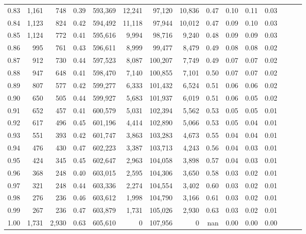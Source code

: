 \begin{tabular}{rrrrrrrrrrrrrrr}
0.83 &   1,161 &    748 &  0.39 &  593,369 &   12,241 &   97,120 &   10,836 &  0.47 &  0.10 &  0.11 &      0.03 \\
0.84 &   1,123 &    824 &  0.42 &  594,492 &   11,118 &   97,944 &   10,012 &  0.47 &  0.09 &  0.10 &      0.03 \\
0.85 &   1,124 &    772 &  0.41 &  595,616 &    9,994 &   98,716 &    9,240 &  0.48 &  0.09 &  0.09 &      0.03 \\
0.86 &     995 &    761 &  0.43 &  596,611 &    8,999 &   99,477 &    8,479 &  0.49 &  0.08 &  0.08 &      0.02 \\
0.87 &     912 &    730 &  0.44 &  597,523 &    8,087 &  100,207 &    7,749 &  0.49 &  0.07 &  0.07 &      0.02 \\
0.88 &     947 &    648 &  0.41 &  598,470 &    7,140 &  100,855 &    7,101 &  0.50 &  0.07 &  0.07 &      0.02 \\
0.89 &     807 &    577 &  0.42 &  599,277 &    6,333 &  101,432 &    6,524 &  0.51 &  0.06 &  0.06 &      0.02 \\
0.90 &     650 &    505 &  0.44 &  599,927 &    5,683 &  101,937 &    6,019 &  0.51 &  0.06 &  0.05 &      0.02 \\
0.91 &     652 &    457 &  0.41 &  600,579 &    5,031 &  102,394 &    5,562 &  0.53 &  0.05 &  0.05 &      0.01 \\
0.92 &     617 &    496 &  0.45 &  601,196 &    4,414 &  102,890 &    5,066 &  0.53 &  0.05 &  0.04 &      0.01 \\
0.93 &     551 &    393 &  0.42 &  601,747 &    3,863 &  103,283 &    4,673 &  0.55 &  0.04 &  0.04 &      0.01 \\
0.94 &     476 &    430 &  0.47 &  602,223 &    3,387 &  103,713 &    4,243 &  0.56 &  0.04 &  0.03 &      0.01 \\
0.95 &     424 &    345 &  0.45 &  602,647 &    2,963 &  104,058 &    3,898 &  0.57 &  0.04 &  0.03 &      0.01 \\
0.96 &     368 &    248 &  0.40 &  603,015 &    2,595 &  104,306 &    3,650 &  0.58 &  0.03 &  0.02 &      0.01 \\
0.97 &     321 &    248 &  0.44 &  603,336 &    2,274 &  104,554 &    3,402 &  0.60 &  0.03 &  0.02 &      0.01 \\
0.98 &     276 &    236 &  0.46 &  603,612 &    1,998 &  104,790 &    3,166 &  0.61 &  0.03 &  0.02 &      0.01 \\
0.99 &     267 &    236 &  0.47 &  603,879 &    1,731 &  105,026 &    2,930 &  0.63 &  0.03 &  0.02 &      0.01 \\
1.00 &   1,731 &  2,930 &  0.63 &  605,610 &        0 &  107,956 &        0 &   nan &  0.00 &  0.00 &      0.00 \\
\bottomrule
\end{tabular}
